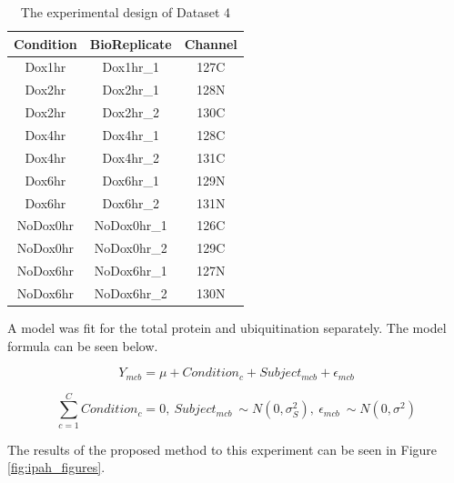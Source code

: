 \documentclass{mcp}
\begin{document}
\begin{table}[h!]
\centering
\begin{tabular}{| c | c | c |}
\hline
 Condition & BioReplicate & Channel \\ [0.5ex]
 \hline\hline
 Dox1hr & Dox1hr\_1 & 127C\\
 \hline
 Dox2hr & Dox2hr\_1 & 128N\\
\hline
 Dox2hr & Dox2hr\_2 & 130C\\
\hline
 Dox4hr & Dox4hr\_1 & 128C\\
\hline
 Dox4hr & Dox4hr\_2 & 131C\\
\hline
 Dox6hr & Dox6hr\_1 & 129N\\
\hline
 Dox6hr & Dox6hr\_2 & 131N\\
\hline
 NoDox0hr & NoDox0hr\_1 & 126C\\
\hline
 NoDox0hr & NoDox0hr\_2 & 129C\\
\hline
 NoDox6hr & NoDox6hr\_1 & 127N\\
\hline
 NoDox6hr & NoDox6hr\_2 & 130N\\
\hline

\end{tabular}
\caption{The experimental design of Dataset 4}
\label{table:ipah_design}
\end{table}

A model was fit for the total protein and ubiquitination separately. The model formula can be seen below.

$$Y_{mcb} = \mu + Condition_c + Subject_{mcb} + \epsilon_{mcb}$$

$$\sum_{c=1}^C{Condition_c} = 0 ,\: Subject_{mcb} ~ \sim N(0, \sigma^2_S) ,\: \epsilon_{mcb} ~ \sim N(0, \sigma^2)$$

The results of the proposed method to this experiment can be seen in Figure \ref{fig:ipah_figures}.
\end{document}
